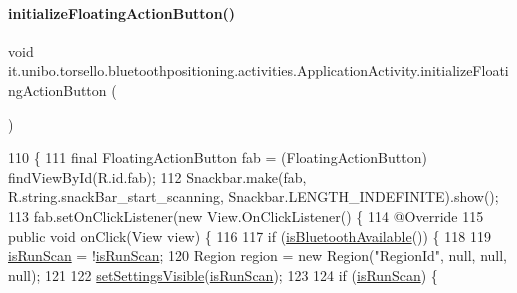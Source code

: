\paragraph{\texorpdfstring{initialize\+Floating\+Action\+Button()}{initializeFloatingActionButton()}}
{\footnotesize\ttfamily void it.\+unibo.\+torsello.\+bluetoothpositioning.\+activities.\+Application\+Activity.\+initialize\+Floating\+Action\+Button (\begin{DoxyParamCaption}{ }\end{DoxyParamCaption})\hspace{0.3cm}{\ttfamily [private]}}


\begin{DoxyCode}
110                                                   \{
111         \textcolor{keyword}{final} FloatingActionButton fab = (FloatingActionButton) findViewById(R.id.fab);
112         Snackbar.make(fab, R.string.snackBar\_start\_scanning, Snackbar.LENGTH\_INDEFINITE).show();
113         fab.setOnClickListener(\textcolor{keyword}{new} View.OnClickListener() \{
114             @Override
115             \textcolor{keyword}{public} \textcolor{keywordtype}{void} onClick(View view) \{
116 
117                 \textcolor{keywordflow}{if} (\hyperlink{classit_1_1unibo_1_1torsello_1_1bluetoothpositioning_1_1activities_1_1ApplicationActivity_abffd55741be864ad5b151c8f8c6d70ff_abffd55741be864ad5b151c8f8c6d70ff}{isBluetoothAvailable}()) \{
118 
119                     \hyperlink{classit_1_1unibo_1_1torsello_1_1bluetoothpositioning_1_1activities_1_1ApplicationActivity_a16080640c95a73d18c2b7ec21b785af1_a16080640c95a73d18c2b7ec21b785af1}{isRunScan} = !\hyperlink{classit_1_1unibo_1_1torsello_1_1bluetoothpositioning_1_1activities_1_1ApplicationActivity_a16080640c95a73d18c2b7ec21b785af1_a16080640c95a73d18c2b7ec21b785af1}{isRunScan};
120                     Region region = \textcolor{keyword}{new} Region(\textcolor{stringliteral}{"RegionId"}, null, null, null);
121 
122                     \hyperlink{classit_1_1unibo_1_1torsello_1_1bluetoothpositioning_1_1activities_1_1ApplicationActivity_a53d1d26ad17526c6c518c4d8b4db3a8e_a53d1d26ad17526c6c518c4d8b4db3a8e}{setSettingsVisible}(\hyperlink{classit_1_1unibo_1_1torsello_1_1bluetoothpositioning_1_1activities_1_1ApplicationActivity_a16080640c95a73d18c2b7ec21b785af1_a16080640c95a73d18c2b7ec21b785af1}{isRunScan});
123 
124                     \textcolor{keywordflow}{if} (\hyperlink{classit_1_1unibo_1_1torsello_1_1bluetoothpositioning_1_1activities_1_1ApplicationActivity_a16080640c95a73d18c2b7ec21b785af1_a16080640c95a73d18c2b7ec21b785af1}{isRunScan}) \{

\end{DoxyCode}

